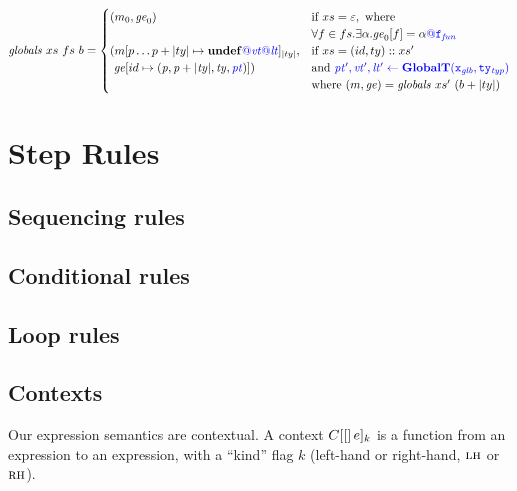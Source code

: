 \documentclass{llncs}
\begin{document}

\[\mathit{globals} ~ xs ~ fs ~ b =
\begin{cases}
  (m_0, \mathit{ge}_0) & \textnormal{if } xs = \varepsilon, \textnormal{ where } \\
  & \forall f \in fs . \exists \alpha . \mathit{ge}_0[f] = \alpha {\color{blue} @} \mathtt{\color{blue} f}_{\color{blue} \mathit{fun}}\\
  (m[p \dots p+|ty| \mapsto \mathbf{undef}{\color{blue} @}\mathit{\color{blue} vt}{\color{blue} @}\mathit{\color{blue} lt}]_{|ty|}, & \textnormal{if } xs = (id,ty)::xs' \\
  ~ \mathit{ge}[id \mapsto (\mathit{p, p+|ty|,ty,\mathit{\color{blue} pt}})]) & \textnormal{and } {\color{blue} \mathit{\color{blue} pt'},\mathit{\color{blue} vt'},\mathit{\color{blue} lt'}\leftarrow \color{blue} \mathbf{GlobalT}(\mathtt{\color{blue} x}_{\color{blue} \mathit{glb}}, \mathtt{\color{blue} ty}_{\color{blue} \mathit{typ}})} \\
  & \textnormal{where } (m,\mathit{ge}) = \mathit{globals} ~ xs' ~ (b + |ty|) \\
\end{cases}\]

\section{Step Rules}
\label{app:rules}

\subsection{Sequencing rules}

\sequencing

\subsection{Conditional rules}

\conditionals

\subsection{Loop rules}

\loops

\subsection{Contexts}
\label{app:contexts}

Our expression semantics are contextual. A context \(C \!\left[[\right]e]_k\) is a function from an
expression to an expression, with a ``kind'' flag \(k\) (left-hand or right-hand, \(\textnormal{\sc lh}\) or \(\textnormal{\sc rh}\)).
\end{document}
